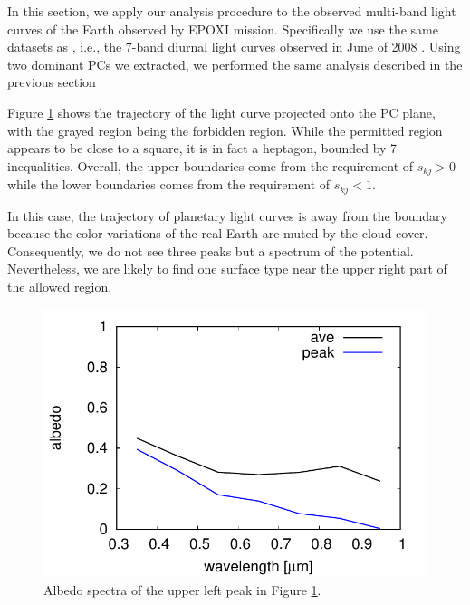 \documentclass[iop,numberedappendix,apj,]{emulateapj}
\begin{document}
In this section, we apply our analysis procedure to the observed multi-band light curves of the Earth observed by EPOXI mission. 
Specifically we use the same datasets as \citet{Cowan2013}, i.e., the 7-band diurnal light curves observed in June of 2008 \citep{Livengood2011}. 
Using two dominant PCs we extracted, we performed the same analysis described in the previous section 

Figure \ref{fig:EPOXI} shows the trajectory of the light curve projected onto the PC plane, with the grayed region being the forbidden region. 
While the permitted region appears to be close to a square, it is in fact a heptagon, bounded by 7 inequalities. Overall, the upper boundaries come from the requirement of $s_{kj}>0$ while the lower boundaries comes from the requirement of $s_{kj}<1$. 

In this case, the trajectory of planetary light curves is away from the boundary because the color variations of the real Earth are muted by the cloud cover. 
Consequently, we do not see three peaks but a spectrum of the potential. 
Nevertheless, we are likely to find one surface type near the upper right part of the allowed region. 

\begin{figure}[tbh!]
    \begin{center}
	\includegraphics[width=\hsize]{raddata_2_norm_Mj_PCs.pdf}
    \end{center}
    \caption{Albedo spectra of the upper left peak in Figure \ref{fig:EPOXI}. }
\label{fig:EPOXI}
\end{figure}
\end{document}
